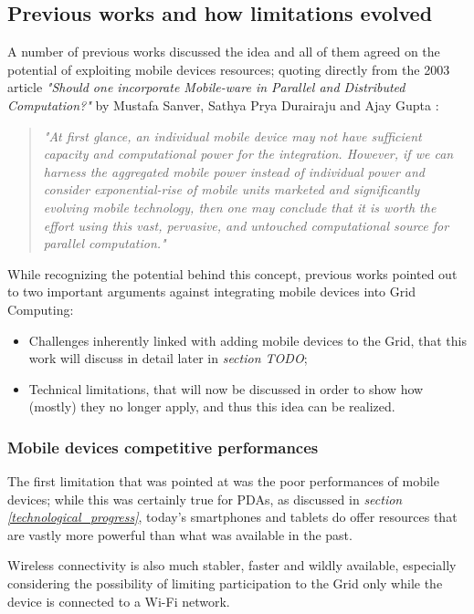 \subsection{Previous works and how limitations evolved}
A number of previous works discussed the idea and all of them agreed on the potential of exploiting mobile devices resources; quoting directly from the 2003 article \textit{"Should one incorporate Mobile-ware in Parallel and Distributed Computation?"} by Mustafa Sanver, Sathya Prya Durairaju and Ajay Gupta \cite{should_one_incorporate_mobile_ware}:
\begin{quotation}
    \textit{"At first glance, an individual mobile device may not have sufficient capacity and computational power for the integration. However, if we can harness the aggregated mobile power instead of individual power and consider exponential-rise of mobile units marketed and significantly evolving mobile technology, then one may conclude that it is worth the effort using this vast, pervasive, and untouched computational source for parallel computation."}
\end{quotation}

While recognizing the potential behind this concept, previous works pointed out to two important arguments against integrating mobile devices into Grid Computing:
\begin{itemize}
    \item Challenges inherently linked with adding mobile devices to the Grid, that this work will discuss in detail later in \textit{section TODO};
    \item Technical limitations, that will now be discussed in order to show how (mostly) they no longer apply, and thus this idea can be realized.
\end{itemize}

\subsubsection{Mobile devices competitive performances}
The first limitation that was pointed at was the poor performances of mobile devices; while this was certainly true for PDAs, as discussed in \textit{section \ref{technological_progress}}, today's smartphones and tablets do offer resources that are vastly more powerful than what was available in the past.

Wireless connectivity is also much stabler, faster and wildly available, especially considering the possibility of limiting participation to the Grid only while the device is connected to a Wi-Fi network.

